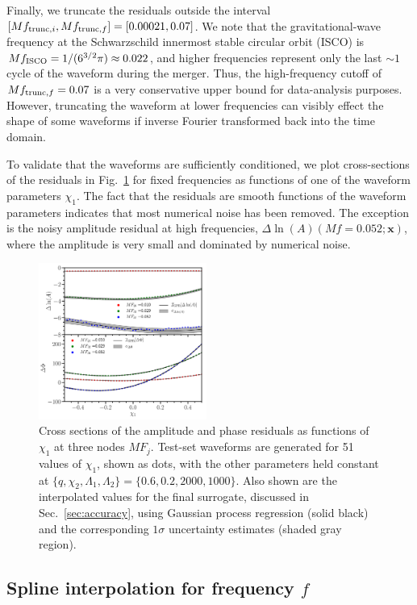 \documentclass[prd,aps,letter,twocolumn,floatfix,notitlepage,nofootinbib]{revtex4-1}
\def\bx{\mathbf{x}}
\begin{document}
Finally, we truncate the residuals outside the interval $[Mf_{{\rm trunc}, i}, Mf_{{\rm trunc}, f}] = [0.00021, 0.07]$. 
We note that the gravitational-wave frequency at the Schwarzschild innermost stable circular orbit (ISCO) is $Mf_{\rm ISCO} = 1/(6^{3/2}\pi) \approx 0.022$, and higher frequencies represent only the last $\sim 1$ cycle of the waveform during the merger. Thus, the high-frequency cutoff of $Mf_{{\rm trunc}, f}=0.07$ is a very conservative upper bound for data-analysis purposes. However, truncating the waveform at lower frequencies can visibly effect the shape of some waveforms if inverse Fourier transformed back into the time domain.

To validate that the waveforms are sufficiently conditioned, we plot cross-sections of the residuals in Fig.~\ref{fig:dhofs} for fixed frequencies as functions of one of the waveform parameters $\chi_1$. The fact that the residuals are smooth functions of the waveform parameters indicates that most numerical noise has been removed. The exception is the noisy amplitude residual at high frequencies, $\Delta\ln(A)(Mf=0.052; \bx)$, where the amplitude is very small and dominated by numerical noise. 

\begin{figure}[htb]
\centering
\includegraphics[width=0.49\textwidth]{dhofs.pdf}
\caption{Cross sections of the amplitude and phase residuals as functions of $\chi_1$ at three nodes $MF_j$. Test-set waveforms are generated for 51 values of $\chi_1$, shown as dots, with the other parameters held constant at $\{q, \chi_2, \Lambda_1, \Lambda_2\} = \{0.6, 0.2, 2000, 1000\}$. Also shown are the interpolated values for the final surrogate, discussed in Sec.~\ref{sec:accuracy}, using Gaussian process regression (solid black) and the corresponding $1\sigma$ uncertainty estimates (shaded gray region).}
\label{fig:dhofs}
\end{figure}

\subsection{Spline interpolation for frequency $f$}
\end{document}
